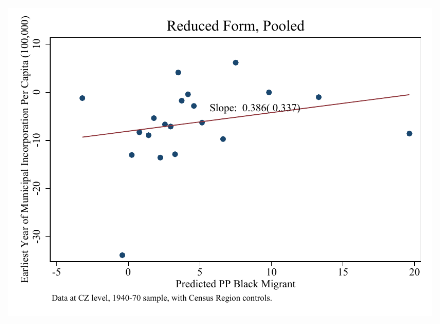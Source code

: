 \documentclass{article}
\begin{document}
\clearpage
\begin{figure}
\centering
\includegraphics{figures/simplefigs/pooled_cgoodman_pc_C3_rf.pdf}
\end{figure}
\clearpage
\end{document}
